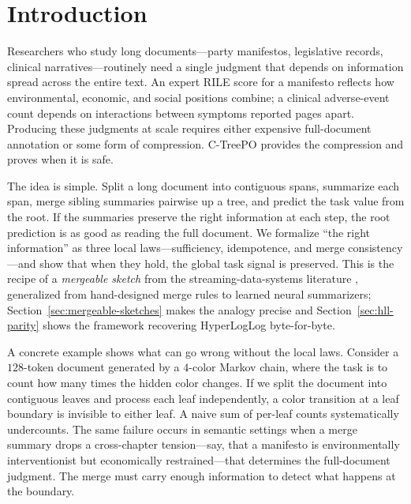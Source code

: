 \section{Introduction}\label{sec:introduction}

Researchers who study long documents---party manifestos, legislative records, clinical narratives---routinely need a single judgment that depends on information spread across the entire text. An expert RILE score for a manifesto reflects how environmental, economic, and social positions combine; a clinical adverse-event count depends on interactions between symptoms reported pages apart. Producing these judgments at scale requires either expensive full-document annotation or some form of compression. C-TreePO provides the compression and proves when it is safe.

The idea is simple. Split a long document into contiguous spans, summarize each span, merge sibling summaries pairwise up a tree, and predict the task value from the root. If the summaries preserve the right information at each step, the root prediction is as good as reading the full document. We formalize ``the right information'' as three local laws---sufficiency, idempotence, and merge consistency---and show that when they hold, the global task signal is preserved. This is the recipe of a \emph{mergeable sketch} from the streaming-data-systems literature \citep{Agarwal2013MergeableTODS}, generalized from hand-designed merge rules to learned neural summarizers; Section~\ref{sec:mergeable-sketches} makes the analogy precise and Section~\ref{sec:hll-parity} shows the framework recovering HyperLogLog byte-for-byte.

A concrete example shows what can go wrong without the local laws. Consider a $128$-token document generated by a $4$-color Markov chain, where the task is to count how many times the hidden color changes. If we split the document into contiguous leaves and process each leaf independently, a color transition at a leaf boundary is invisible to either leaf. A naive sum of per-leaf counts systematically undercounts. The same failure occurs in semantic settings when a merge summary drops a cross-chapter tension---say, that a manifesto is environmentally interventionist but economically restrained---that determines the full-document judgment. The merge must carry enough information to detect what happens at the boundary.

